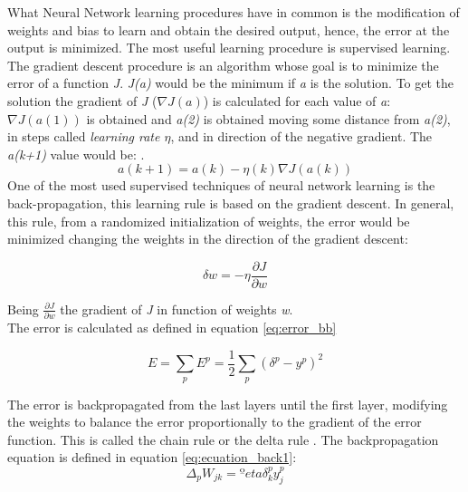 What Neural Network learning procedures have in common is the modification of weights and bias to learn and obtain the desired output, hence, the error at the output is minimized. The most useful learning procedure is supervised learning.\\

The gradient descent procedure is an algorithm whose goal is to minimize the error of a function \textit{J}. \textit{J(a)} would be the minimum if \textit{a} is the solution. To get the solution the gradient of \textit{J} ($\nabla J(a)$) is calculated for each value of \textit{a}: $\nabla J(a(1))$ is obtained and \textit{a(2)} is obtained moving some distance from \textit{a(2)}, in steps called \textit{learning rate $\eta$}, and in direction of the negative gradient. The \textit{a(k+1)} value would be: \cite{Duda}.\\

\begin{equation}
a(k+1) = a(k) - \eta (k) \nabla J(a(k))
\end{equation}
One of the most used supervised techniques of neural network learning is the back-propagation, this learning rule is based on the gradient descent. In general, this rule, from a randomized initialization of weights, the error would be minimized changing the weights in the direction of the gradient descent:

\begin{equation}
\delta w = -\eta\frac{\partial J}{\partial w}
\end{equation}

Being $\frac{\partial J}{\partial w}$ the gradient of \textit{J} in function of weights \textit{w}.\\

The error is calculated as defined in equation \ref{eq:error_bb}

\begin{equation}
E=\sum_{p}E^p = \frac{1}{2}\sum_{p}(\delta^p- y^p)^2
\end{equation} \label{eq:error_bb}

The error is backpropagated from the last layers until the first layer, modifying the weights to balance the error proportionally to the gradient of the error function. This is called the chain rule or the delta rule \cite{Duda, BINN, krose}. The backpropagation equation is defined in equation \ref{eq:ecuation_back1}:\\

			\begin{equation}
			\Delta_{p}W_{jk}=ºeta \delta _{k}^{p}y_{j}^{p}
			\label{eq:ecuation_back1}
			\end{equation}\\


